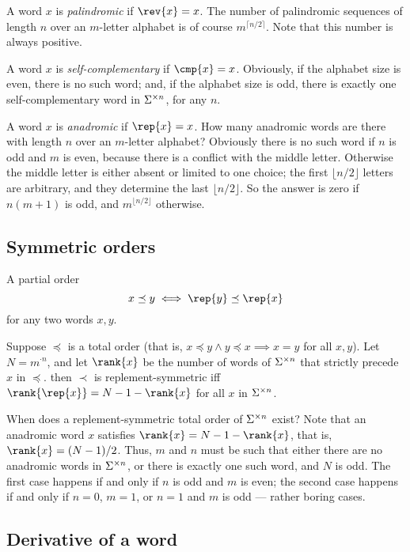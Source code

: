 A word $x$ is {\em palindromic} if $\rev{x}=x$.  The number of 
palindromic sequences of length $n$ over an $m$-letter alphabet
is of course $m^{\lceil n/2\rceil}$. Note that this number is always
positive.

A word $x$ is {\em self-complementary} if $\cmp{x}=x$.  
Obviously, if the alphabet size is even, there is no such word;
and, if the alphabet size is odd, there is exactly one self-complementary
word in $\Sigma^{\times n}$, for any $n$.

A word $x$ is {\em anadromic} if $\rep{x}=x$. How many anadromic words
are there with length $n$ over an $m$-letter alphabet? Obviously
there is no such word 
if $n$ is odd and $m$ is even, because there is a conflict with the
middle letter.  Otherwise the middle letter is either absent or
limited to one choice; the first $\lfloor n/2\rfloor$
letters are arbitrary, and they determine the last $\lfloor n/2\rfloor$.
So the answer is zero if $n(m+1)$ is odd, and $m^{\lfloor n/2\rfloor}$
otherwise.

\subsection{Symmetric orders}

A partial order %
\[
  x \preceq y \iff \rep{y}\preceq \rep{x}
\]
for any two words $x,y$. 

Suppose $\preceq$ is a total order (that is, $x\preceq y \wedge
y\preceq x\implies x=y$ for all $x,y$).  Let $N=m^{\cdot n}$, and let
$\rank{x}$ be the number of words of $\Sigma^{\times n}$ that strictly precede
$x$ in $\preceq$.  then $\prec$ is replement-symmetric iff
$\rank{\rep{x}} = N-1-\rank{x}$ for all $x$ in $\Sigma^{\times n}$.

When does a replement-symmetric total order of $\Sigma^{\times n}$ exist?
Note that an anadromic word $x$ satisfies $\rank{x}=N-1-\rank{x}$,
that is, $\rank{x}=(N-1)/2$.  Thus, $m$ and $n$ must be such that
either there are no anadromic words in $\Sigma^{\times n}$, or there is 
exactly one such word, and $N$ is odd.  The first case happens if and
only if $n$ is odd and $m$ is even; the second case happens if and only if 
$n=0$, $m=1$, or $n=1$ and $m$ is odd --- rather boring cases.

\subsection{Derivative of a word}

